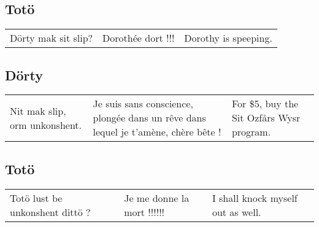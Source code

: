 \subsection*{Totö}
\begin{tabular}{p{3.7cm}|p{3.7cm}|p{3.7cm}}
Dörty mak sit slip?&
Dorothée dort !!!&
Dorothy is speeping.
\end{tabular}\par
\subsection*{Dörty}
\begin{tabular}{p{3.7cm}|p{3.7cm}|p{3.7cm}}
Nit mak slip, orm unkonshent.&
Je suis sans conscience, plongée dans un rêve dans lequel je t'amène, chère
bête !&
For \$5, buy the Sit Ozfårs Wysr program.
\end{tabular}\par
\subsection*{Totö}
\begin{tabular}{p{3.7cm}|p{3.7cm}|p{3.7cm}}
Totö lust be unkonshent dittö ?&
Je me donne la mort !!!!!!&
I shall knock myself out as well.
\end{tabular}\par
[\emph{Toto se frappe avec un rocher et s'allonge sans conscience à côté de
Dorothée. Une lueur trembloante et vacillante suggère l'intensité de l'orage
et le passage du monde du réel au monde du rêve de Dorothée. En même temps,
la compagnie chante le morceau} \og{}l'orage\fg{}, \emph{un morceau
composé de bruitage autour des sons d'un orage.}]
